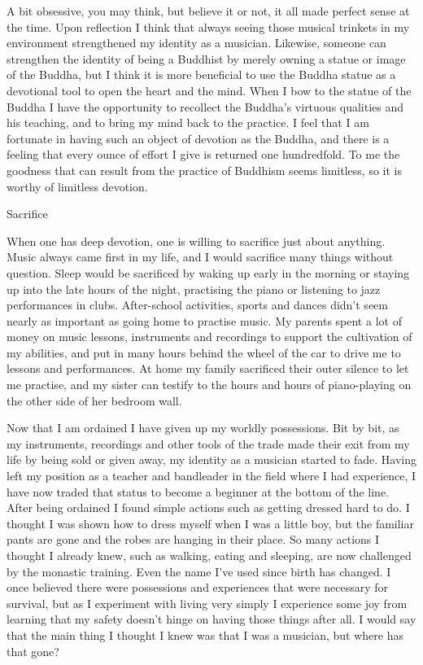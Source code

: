 A bit obsessive, you may think, but believe it or not, it all made
perfect sense at the time. Upon reflection I think that always seeing
those musical trinkets in my environment strengthened my identity as a
musician. Likewise, someone can strengthen the identity of being a
Buddhist by merely owning a statue or image of the Buddha, but I think
it is more beneficial to use the Buddha statue as a devotional tool to
open the heart and the mind. When I bow to the statue of the Buddha I
have the opportunity to recollect the Buddha's virtuous qualities and
his teaching, and to bring my mind back to the practice. I feel that I
am fortunate in having such an object of devotion as the Buddha, and
there is a feeling that every ounce of effort I give is returned one
hundredfold. To me the goodness that can result from the practice of
Buddhism seems limitless, so it is worthy of limitless devotion.

Sacrifice

When one has deep devotion, one is willing to sacrifice just about
anything. Music always came first in my life, and I would sacrifice many
things without question. Sleep would be sacrificed by waking up early in
the morning or staying up into the late hours of the night, practising
the piano or listening to jazz performances in clubs. After-school
activities, sports and dances didn't seem nearly as important as going
home to practise music. My parents spent a lot of money on music
lessons, instruments and recordings to support the cultivation of my
abilities, and put in many hours behind the wheel of the car to drive me
to lessons and performances. At home my family sacrificed their outer
silence to let me practise, and my sister can testify to the hours and
hours of piano-playing on the other side of her bedroom wall.

Now that I am ordained I have given up my worldly possessions. Bit by
bit, as my instruments, recordings and other tools of the trade made
their exit from my life by being sold or given away, my identity as a
musician started to fade. Having left my position as a teacher and
bandleader in the field where I had experience, I have now traded that
status to become a beginner at the bottom of the line. After being
ordained I found simple actions such as getting dressed hard to do. I
thought I was shown how to dress myself when I was a little boy, but the
familiar pants are gone and the robes are hanging in their place. So
many actions I thought I already knew, such as walking, eating and
sleeping, are now challenged by the monastic training. Even the name
I've used since birth has changed. I once believed there were
possessions and experiences that were necessary for survival, but as I
experiment with living very simply I experience some joy from learning
that my safety doesn't hinge on having those things after all. I would
say that the main thing I thought I knew was that I was a musician, but
where has that gone?

